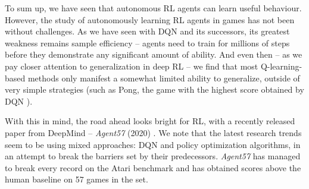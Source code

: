 To sum up, we have seen that autonomous RL agents can learn useful behaviour.
However, the study of autonomously learning RL agents in games has not been without challenges.
As we have seen with DQN and its successors, its greatest weakness remains sample efficiency -- agents need to train for millions of steps before they demonstrate any significant amount of ability.
And even then -- as we pay closer attention to generalization in deep RL -- we find that most Q-learning-based methods only manifest a somewhat limited ability to generalize, outside of very simple strategies (such as Pong, the game with the highest score obtained by DQN \cite{atari-dqn}).

With this in mind, the road ahead looks bright for RL, with a recently released paper from DeepMind – \emph{Agent57} (2020) \cite{agent57-paper}. We note that the latest research trends seem to be using mixed approaches: DQN and policy optimization algorithms, in an attempt to break the barriers set by their predecessors.
\emph{Agent57} has managed to break every record on the Atari benchmark and has obtained scores above the human baseline on 57 games in the set.
